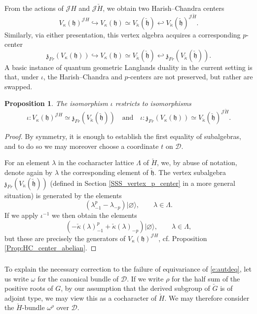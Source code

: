 \documentclass{amsart}
\newtheorem{Prop}[Thm]{Proposition}
\theoremstyle{definition}
\newcommand{\fh}{\mathfrak{h}}
\newcommand{\sss}{\subsubsection{}}
\newcommand{\D}{\sD}
\newcommand{\sD}{\mathscr{D}}
\newcommand{\Jet}{\mathscr{J}}
\newcommand{\frz}{\mathfrak{z}}
\newcommand{\ckappa}{\check{\kappa}}
\numberwithin{equation}{section}
\begin{document}
From the actions of $\Jet H$ and $\Jet\check{H}$, we obtain two Harish--Chandra centers
$$V_\kappa(\fh)^{\Jet H} \hookrightarrow V_\kappa(\fh) \simeq V_{\check{\kappa}}(\check{\fh}) \hookleftarrow V_{\check{\kappa}}(\check{\fh})^{\Jet\check{H}}.$$
Similarly, via either presentation, this vertex algebra acquires a corresponding $p$-center
$$\mathfrak{z}_{Fr}(V_\kappa(\fh)) \hookrightarrow V_\kappa(\fh) \simeq V_{\ckappa}(\check{\mathfrak{h}}) \hookleftarrow \mathfrak{z}_{Fr}(V_{\ckappa}(\check{\mathfrak{h}})).$$
A basic instance of quantum geometric Langlands duality in the current setting is that, under $\iota$, the Harish--Chandra and $p$-centers are not preserved, but rather are swapped. 

\begin{Prop} \label{p:pvsHCswap}The isomorphism $\iota$ restricts to isomorphisms 
$$\iota: V_\kappa(\fh)^{\Jet H} \simeq \frz_{Fr}(V_{\ckappa}(\check{\mathfrak{h}})) \quad \text{and} \quad \iota: \frz_{Fr}(V_\kappa(\fh)) \simeq V_{\ckappa}(\check{\mathfrak{h}})^{\Jet \check{H}}.$$
\end{Prop}

\begin{proof} By symmetry, it is enough to establish the first equality of subalgebras, and to do so we may moreover choose a coordinate $t$ on $\D$.

For an element $\lambda$ in the cocharacter lattice $\Lambda$ of $\check{H}$, we, by abuse of notation, denote again by $\lambda$ the corresponding element of $\check{\mathfrak{h}}$. The vertex subalgebra $\frz_{Fr}(V_{\ckappa}(\check{\mathfrak{h}}))$ (defined in Section \ref{SSS_vertex_p_center} in a more general situation) is generated by the elements 
$$(\lambda_{-1}^p - \lambda_{-p})|\varnothing\rangle, \quad \quad \lambda \in \Lambda.$$
If we apply $\iota^{-1}$ we then obtain the elements
$$(-\ckappa(\lambda)_{-1}^p + \ckappa(\lambda)_{-p})|\varnothing\rangle, \quad \quad \lambda \in \Lambda,$$
but these are precisely the generators of $V_{\kappa}(\fh)^{\Jet H}$, cf. Proposition \ref{Prop:HC_center_abelian}. \end{proof}
    


\sss{} To explain the necessary correction to the failure of equivariance of \eqref{e:autdeq}, let us write $\omega$ for the canonical bundle of $\D$. If we write $\rho$ for the half sum of the positive roots of $G$, by our assumption that the derived subgroup of $\check{G}$ is of adjoint type, we may view this as a cocharacter of $\check{H}$. We may therefore consider the $\check{H}$-bundle $\omega^\rho$ over $\D$. 
\end{document}
